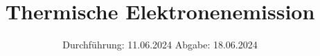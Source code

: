 

\subject{v504}
\title{Thermische Elektronenemission}
\date{%
  Durchführung: 11.06.2024
  \hspace{3em}
  Abgabe: 18.06.2024
}



\maketitle
\thispagestyle{empty}
\tableofcontents
\newpage






\printbibliography{}

